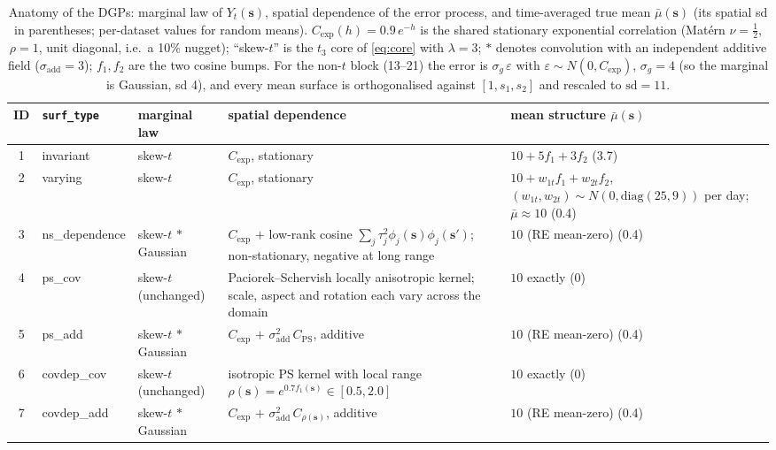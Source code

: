 \documentclass[11pt]{article}
\newcommand{\bs}{\boldsymbol{s}}
\begin{document}
\begin{table}[ht]
\centering\footnotesize
\caption{Anatomy of the DGPs: marginal law of $Y_t(\bs)$, spatial
dependence of the error process, and time-averaged true mean $\bar\mu(\bs)$
(its spatial sd in parentheses; per-dataset values for random means).
$C_{\mathrm{exp}}(h) = 0.9\, e^{-h}$ is the shared stationary exponential
correlation (Mat\'ern $\nu = \tfrac12$, $\rho = 1$, unit diagonal, i.e.\ a 10\%
nugget); ``skew-$t$'' is the $t_3$ core of \eqref{eq:core} with $\lambda = 3$;
$\ast$ denotes convolution with an independent additive field
($\sigma_{\mathrm{add}} = 3$); $f_1, f_2$ are the two cosine bumps. For the
non-$t$ block (13--21) the error is $\sigma_g\,\varepsilon$ with
$\varepsilon \sim N(0, C_{\mathrm{exp}})$, $\sigma_g = 4$ (so the marginal is
Gaussian, sd 4), and every mean surface is orthogonalised against
$[1,s_1,s_2]$ and rescaled to $\mathrm{sd} = 11$.}
\label{tab:anatomy}
\begin{tabular}{clp{3.3cm}p{4.4cm}p{3.9cm}}
\toprule
ID & \texttt{surf\_type} & marginal law & spatial dependence & mean structure $\bar\mu(\bs)$ \\
\midrule
1  & invariant         & skew-$t$ & $C_{\mathrm{exp}}$, stationary & $10 + 5f_1 + 3f_2$ \hfill (3.7) \\
2  & varying           & skew-$t$ & $C_{\mathrm{exp}}$, stationary & $10 + w_{1t}f_1 + w_{2t}f_2$, $(w_{1t},w_{2t}) \sim N(0,\mathrm{diag}(25,9))$ per day; $\bar\mu \approx 10$ \hfill (0.4) \\
3  & ns\_dependence    & skew-$t$ $\ast$ Gaussian & $C_{\mathrm{exp}}$ $+$ low-rank cosine $\sum_j \tau_j^2 \phi_j(\bs)\phi_j(\bs')$; non-stationary, negative at long range & $10$ (RE mean-zero) \hfill (0.4) \\
4  & ps\_cov           & skew-$t$ (unchanged) & Paciorek--Schervish locally anisotropic kernel; scale, aspect and rotation each vary across the domain & $10$ exactly \hfill (0) \\
5  & ps\_add           & skew-$t$ $\ast$ Gaussian & $C_{\mathrm{exp}}$ $+$ $\sigma_{\mathrm{add}}^2\, C_{\mathrm{PS}}$, additive & $10$ (RE mean-zero) \hfill (0.4) \\
6  & covdep\_cov       & skew-$t$ (unchanged) & isotropic PS kernel with local range $\rho(\bs) = e^{0.7 f_1(\bs)} \in [0.5, 2.0]$ & $10$ exactly \hfill (0) \\
7  & covdep\_add       & skew-$t$ $\ast$ Gaussian & $C_{\mathrm{exp}}$ $+$ $\sigma_{\mathrm{add}}^2\, C_{\rho(\bs)}$, additive & $10$ (RE mean-zero) \hfill (0.4) \\

\end{tabular}
\end{table}
\end{document}
